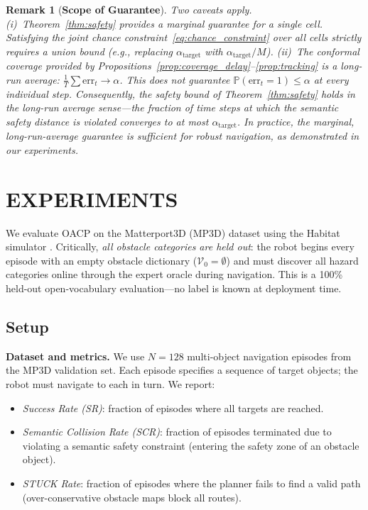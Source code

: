 \documentclass[letterpaper, 10 pt, conference]{ieeeconf}  %
\newtheorem{remark}{Remark}
\begin{document}
\begin{remark}[\textbf{Scope of Guarantee}]
Two caveats apply.
(i)~Theorem~\ref{thm:safety} provides a marginal guarantee for a single cell. Satisfying the joint chance constraint~\eqref{eq:chance_constraint} over all cells strictly requires a union bound (e.g., replacing $\alpha_{\text{target}}$ with $\alpha_{\text{target}} / M$).
(ii)~The conformal coverage provided by Propositions~\ref{prop:coverage_delay}--\ref{prop:tracking} is a \emph{long-run average}: $\frac{1}{T}\sum \text{err}_t \to \alpha$. This does not guarantee $\mathbb{P}(\text{err}_t = 1) \le \alpha$ at every individual step. Consequently, the safety bound of Theorem~\ref{thm:safety} holds in the long-run average sense---the fraction of time steps at which the semantic safety distance is violated converges to at most $\alpha_{\text{target}}$.
In practice, the marginal, long-run-average guarantee is sufficient for robust navigation, as demonstrated in our experiments.
\end{remark}






\section{EXPERIMENTS}
\label{sec:experiments}

We evaluate OACP on the Matterport3D (MP3D) dataset \cite{chang2017matterport3d} using the Habitat simulator \cite{savva2019habitat}. Critically, \textit{all obstacle categories are held out}: the robot begins every episode with an empty obstacle dictionary ($\mathcal{V}_0 = \emptyset$) and must discover all hazard categories online through the expert oracle during navigation. This is a 100\% held-out open-vocabulary evaluation---no label is known at deployment time.

\subsection{Setup}

\textbf{Dataset and metrics.}
We use $N=128$ multi-object navigation episodes from the MP3D validation set. Each episode specifies a sequence of target objects; the robot must navigate to each in turn. We report:
\begin{itemize}
    \item \textit{Success Rate (SR)}: fraction of episodes where all targets are reached.
    \item \textit{Semantic Collision Rate (SCR)}: fraction of episodes terminated due to violating a semantic safety constraint (entering the safety zone of an obstacle object).
    \item \textit{STUCK Rate}: fraction of episodes where the planner fails to find a valid path (over-conservative obstacle maps block all routes).
\end{itemize}
\end{document}
